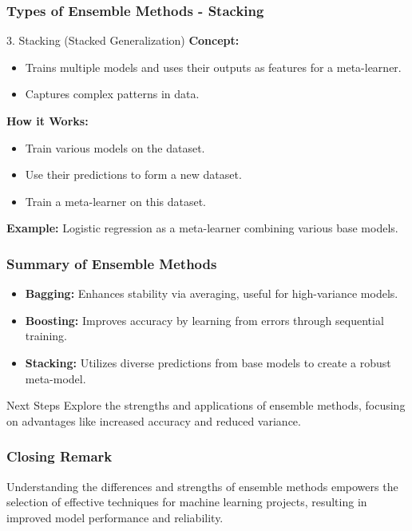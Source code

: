 \documentclass[aspectratio=169]{beamer}
\begin{document}
\begin{frame}[fragile]
    \frametitle{Types of Ensemble Methods - Stacking}
    \begin{block}{3. Stacking (Stacked Generalization)}
        \textbf{Concept:}
        \begin{itemize}
            \item Trains multiple models and uses their outputs as features for a meta-learner.
            \item Captures complex patterns in data.
        \end{itemize}

        \textbf{How it Works:}
        \begin{itemize}
            \item Train various models on the dataset.
            \item Use their predictions to form a new dataset.
            \item Train a meta-learner on this dataset.
        \end{itemize}

        \textbf{Example:} Logistic regression as a meta-learner combining various base models.
    \end{block}
\end{frame}

\begin{frame}[fragile]
    \frametitle{Summary of Ensemble Methods}
    \begin{itemize}
        \item \textbf{Bagging:} Enhances stability via averaging, useful for high-variance models.
        \item \textbf{Boosting:} Improves accuracy by learning from errors through sequential training.
        \item \textbf{Stacking:} Utilizes diverse predictions from base models to create a robust meta-model.
    \end{itemize}

    \begin{block}{Next Steps}
        Explore the strengths and applications of ensemble methods, focusing on advantages like increased accuracy and reduced variance.
    \end{block}
\end{frame}

\begin{frame}[fragile]
    \frametitle{Closing Remark}
    Understanding the differences and strengths of ensemble methods empowers the selection of effective techniques for machine learning projects, resulting in improved model performance and reliability.
\end{frame}
\end{document}
